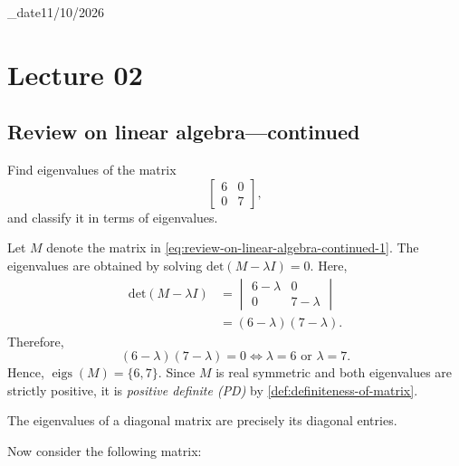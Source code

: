 \lecture_date{11/10/2026}
\chapter{Lecture 02}

\section{Review on linear algebra---continued}

\begin{exercise}
	Find eigenvalues of the matrix
	\begin{equation}
		\begin{bmatrix} 6 & 0\\0 & 7 \end{bmatrix},
		\label{eq:review-on-linear-algebra-continued-1}
	\end{equation}
	and classify it in terms of eigenvalues.
\end{exercise}
\begin{answer}
	Let \( M \) denote the matrix in \eqref{eq:review-on-linear-algebra-continued-1}.
	The eigenvalues are obtained by solving \( \mathrm{det}(M - \lambda I) = 0 \). Here,
	\begin{equation}
		\begin{aligned}
			\mathrm{det}(M - \lambda I)
			 & = \begin{vmatrix} 6 - \lambda & 0\\ 0 & 7 - \lambda \end{vmatrix} \\
			 & = (6 - \lambda)(7 - \lambda).
		\end{aligned}
		\label{eq:lecture-02-exercise-1-answer-1}
	\end{equation}
	Therefore,
	\begin{equation}
		(6 - \lambda)(7 - \lambda) = 0
		\iff \lambda = 6 \text{ or } \lambda = 7.
		\label{eq:lecture-02-exercise-1-answer-2}
	\end{equation}
	Hence, \( \operatorname{eigs}(M) = \{6,7\} \).
	Since \( M \) is real symmetric and both eigenvalues are strictly positive,
	it is \emph{positive definite (PD)} by \autoref{def:definiteness-of-matrix}.
\end{answer}

\begin{remark}
	The eigenvalues of a diagonal matrix are precisely its diagonal entries.
\end{remark}

Now consider the following matrix:

